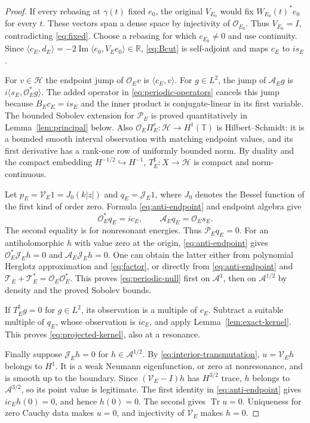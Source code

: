 \documentclass[11pt]{amsart}
\numberwithin{equation}{section}
\newcommand{\HH}{\mathscr H}
\newcommand{\T}{\mathbb T}
\newcommand{\OO}{\mathcal O}
\newcommand{\TT}{\mathcal T}
\newcommand{\Aop}{\mathcal A}
\newcommand{\PP}{\mathcal P}
\newcommand{\JJ}{\mathcal J}
\newcommand{\VV}{\mathcal V}
\newcommand{\ip}[2]{\langle #1,#2\rangle}
\begin{document}
\begin{proof}
If every rebasing at $\gamma(t)$ fixed $e_0$, the original $V_{E_0}$
would fix $W_{E_0}(t)^*e_0$ for every $t$. These vectors span a dense
space by injectivity of $\OO_{E_0}$. Thus $V_{E_0}=I$, contradicting
\eqref{eq:fixed}. Choose a rebasing for which $c_{E_0}\ne0$ and use
continuity. Since
$\ip{c_E}{d_E}=-2\operatorname{Im}\ip{e_0}{V_Ee_0}\in\mathbb R$,
\eqref{eq:Bcut} is self-adjoint and maps $c_E$ to $is_E$.

For $v\in\HH$ the endpoint jump of $\OO_Ev$ is $\ip{c_E}v$.
For $g\in L^2$, the jump of $\Aop_Eg$ is $i\ip{s_E}{\OO_E^*g}$.
The added operator in \eqref{eq:periodic-operators} cancels this jump
because $B_Ec_E=is_E$ and the inner product is conjugate-linear in its
first variable. The bounded Sobolev extension for $\PP_E$ is proved
quantitatively in Lemma~\ref{lem:principal} below.
Also $\OO_E\Pi_E^c:\HH\to H^1(\T)$ is Hilbert--Schmidt: it is a
bounded smooth interval observation with matching endpoint values, and
its first derivative has a rank-one row of uniformly bounded norm.
By duality and the compact embedding $H^{-1/2}\hookrightarrow H^{-1}$,
$T_E^\sharp:X\to\HH$ is compact and norm-continuous.

Let $p_E=\VV_E1=J_0(k|z|)$ and $q_E=\JJ_E1$, where $J_0$ denotes
the Bessel function of the first kind of order zero. Formula
\eqref{eq:anti-endpoint} and endpoint algebra give
\begin{equation}\label{eq:radial}
 \OO_E^*q_E=ic_E,\qquad \Aop_Eq_E=\OO_Es_E.
\end{equation}
The second equality is for nonresonant energies. Thus $\PP_Eq_E=0$.
For an antiholomorphic $h$ with value zero at the origin,
\eqref{eq:anti-endpoint} gives $\OO_E^*\JJ_Eh=0$ and
$\Aop_E\JJ_Eh=0$. One can obtain the latter either from polynomial
Herglotz approximation and \eqref{eq:factor}, or directly from
\eqref{eq:anti-endpoint} and $\TT_E+\TT_E^*=\OO_E\OO_E^*$.
This proves \eqref{eq:periodic-null} first on $\mathscr A^1$, then on
$\mathscr A^{1/2}$ by density and the proved Sobolev bounds.

If $T_E^\sharp g=0$ for $g\in L^2$, its observation is a multiple of
$c_E$. Subtract a suitable multiple of $q_E$, whose observation is
$ic_E$, and apply Lemma~\ref{lem:exact-kernel}. This proves
\eqref{eq:projected-kernel}, also at a resonance.

Finally suppose $\JJ_Eh=0$ for $h\in\mathscr A^{1/2}$.
By \eqref{eq:interior-transmutation}, $u=\VV_Eh$ belongs to $H^1$.
It is a weak Neumann eigenfunction, or zero at nonresonance, and is smooth up to
the boundary. Since $(\VV_E-I)h$ has $H^{3/2}$ trace, $h$ belongs to
$\mathscr A^{3/2}$, so its point value is legitimate. The first identity
in \eqref{eq:anti-endpoint} gives $ic_Eh(0)=0$, and hence $h(0)=0$.
The second gives $\operatorname{Tr}u=0$. Uniqueness for zero Cauchy data
makes $u=0$, and injectivity of $\VV_E$ makes $h=0$.
\end{proof}
\end{document}
